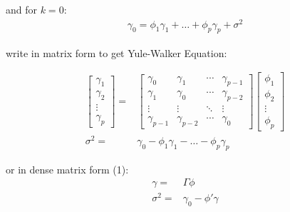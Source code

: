 \begin{itemize}[topsep=2pt,itemsep=0pt]
        and for $ k=0 $:
        \begin{align*}
            \gamma _0=\phi _1\gamma _1+\ldots+\phi _p\gamma _p+\sigma ^2
        \end{align*}



        write in matrix form to get Yule-Walker Equation:
        
        \begin{align*}
            \begin{bmatrix}
                \gamma _1\\\gamma _2\\ \vdots\\\gamma _p
            \end{bmatrix} =&
            \begin{bmatrix}
                \gamma _0&\gamma _1&\cdots&\gamma _{p-1}\\
                \gamma _1&\gamma _0&\cdots&\gamma _{p-2}\\
                \vdots&\vdots&\ddots&\vdots\\
                \gamma _{p-1}&\gamma _{p-2}&\cdots&\gamma _0
            \end{bmatrix}
            \begin{bmatrix}
                \phi _1\\\phi _2\\ \vdots \\\phi _p
            \end{bmatrix}\\
            \sigma ^2 =& \gamma _0-\phi _1\gamma _1-\ldots-\phi _p\gamma _p
        \end{align*}
        
        or in dense matrix form (1):
        \begin{align*}
            \gamma =&\Gamma \phi \\
            \sigma ^2=&\gamma _0-\phi '\gamma 
        \end{align*}


\end{itemize}
